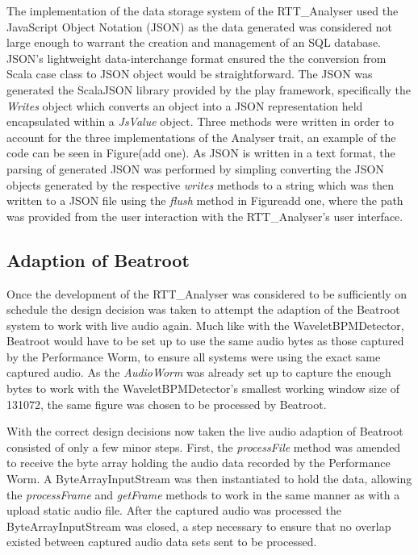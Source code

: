 \documentclass[a4paper, 11pt]{article}
\begin{document}
The implementation of the data storage system of the RTT\_Analyser used the JavaScript Object Notation (JSON) as the data generated was considered not large enough to warrant the creation and management of an SQL database. JSON's lightweight data-interchange format\cite{json} ensured the the conversion from Scala case class to JSON object would be straightforward. The JSON was generated the ScalaJSON library provided by the play framework\cite{play}, specifically the \textit{Writes} object which converts an object into a JSON representation held encapsulated within a \textit{JsValue} object. Three methods were written in order to account for the three implementations of the Analyser trait, an example of the code can be seen in Figure(add one). As JSON is written in a text format\cite{json}, the parsing of generated JSON was performed by simpling converting the JSON objects generated by the respective \textit{writes} methods to a string which was then written to a JSON file using the \textit{flush} method in Figure{add one}, where the path was provided from the user interaction with the RTT\_Analyser's user interface.


\subsection{Adaption of Beatroot}
Once the development of the RTT\_Analyser was considered to be sufficiently on schedule the design decision was taken to attempt the adaption of the Beatroot system to work with live audio again. Much like with the WaveletBPMDetector, Beatroot would have to be set up to use the same audio bytes as those captured by the Performance Worm, to ensure all systems were using the exact same captured audio. As the \textit{AudioWorm} was already set up to capture the enough bytes to work with the WaveletBPMDetector's smallest working window size of 131072, the same figure was chosen to be processed by Beatroot. \par
With the correct design decisions now taken the live audio adaption of Beatroot consisted of only a few minor steps. First, the \textit{processFile} method was amended to receive the byte array holding the audio data recorded by the Performance Worm. A ByteArrayInputStream was then instantiated to hold the data, allowing the \textit{processFrame} and \textit{getFrame} methods to work in the same manner as with a upload static audio file. After the captured audio was processed the ByteArrayInputStream was closed, a step necessary to ensure that no overlap existed between captured audio data sets sent to be processed.
\end{document}
